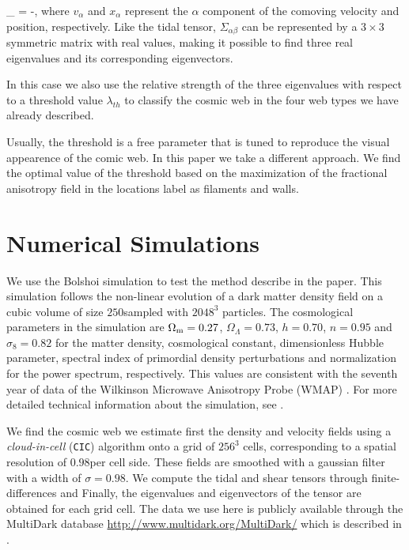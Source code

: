 \documentclass[a4,useAMS,usenatbib,usegraphicx]{latex/mn2e}
\begin{document}
{	\Sigma_{\alpha\beta} = -,}
where $v_{\alpha}$ and $x_{\alpha}$ represent the $\alpha$ component of 
the comoving velocity and position, respectively. Like the tidal tensor, 
$\Sigma_{\alpha\beta}$ can be represented by a $3\times 3$ symmetric 
matrix with real values, making it possible to find three real
eigenvalues and its corresponding eigenvectors.

In this case we also use the relative strength of the three eigenvalues with 
respect to a threshold value $\lambda_{th}$ to classify the cosmic web
in the four web types we have already described.

Usually, the threshold is a free parameter that is tuned to reproduce
the visual appearence of the comic web. 
In this paper we take a different approach.
We find the optimal value of the threshold based on the maximization
of the fractional anisotropy field in the locations label as filaments
and walls. 


\section{Numerical Simulations}
\label{sec:simulatins}

We use the Bolshoi simulation to test the method describe in the
paper. 
This simulation follows the non-linear evolution of a dark
matter density field on a cubic volume of  size $250$\hMpc sampled
with $2048^3$ particles. 
The cosmological parameters in the simulation are $\Omega_{\rm m}=0.27$,  $\Omega_{\Lambda}  =0.73$, $h=0.70$,
$n=0.95$ and $\sigma_{8}=0.82$ for the matter density,   cosmological
constant, dimensionless Hubble parameter, spectral index of
primordial density perturbations and normalization for the power
spectrum, respectively. 
This values are consistent with the seventh year of data of the Wilkinson 
Microwave Anisotropy Probe (WMAP) \citep{Jarosik11}. 
For more detailed  technical information about the simulation, see
\citet{Klypin11}. 


We find the cosmic web we estimate first the density and velocity
fields using a  \textit{cloud-in-cell} (\texttt{CIC}) algorithm onto a grid of $256^3$ 
cells, corresponding to a spatial resolution of $0.98$\hMpc per cell
side.  
These fields are smoothed with a gaussian filter with a width of
$\sigma=0.98$\hMpc. 
We compute the tidal and shear tensors through finite-differences and
Finally, the eigenvalues and eigenvectors of the tensor are
obtained for each grid cell.
The data we use here is publicly available through the MultiDark
database \url{http://www.multidark.org/MultiDark/} which is described
in \citet{Riebe11}.
\end{document}
